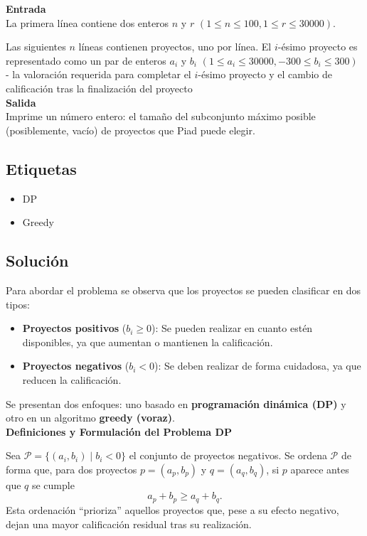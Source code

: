 ﻿\documentclass{article}
\theoremstyle{plain}
\theoremstyle{definition}
\begin{document}
\textbf{Entrada}\\

La primera línea contiene dos enteros $n$ y $r$ $(1 \leq n \leq 100,1 \leq r \leq 30000)$.

Las siguientes $n$ líneas contienen proyectos, uno por línea. El $i$-ésimo proyecto es representado como un par de enteros $a_i$ y $b_i$ $(1 \leq a_i \leq 30000,-300 \leq b_i \leq 300)$ - la valoración requerida para completar el $i$-ésimo proyecto y el cambio de calificación tras la finalización del proyecto
\\

\textbf{Salida}\\

Imprime un número entero: el tamaño del subconjunto máximo posible (posiblemente, vacío) de proyectos que Piad puede elegir.

\subsection{Etiquetas}

\begin{itemize}
    \item DP
    \item Greedy
\end{itemize}

\subsection{Solución}

Para abordar el problema se observa que los proyectos se pueden clasificar en dos tipos:
\begin{itemize}
    \item \textbf{Proyectos positivos} (\(b_i \ge 0\)): Se pueden realizar en cuanto estén disponibles, ya que aumentan o mantienen la calificación.
    \item \textbf{Proyectos negativos} (\(b_i < 0\)): Se deben realizar de forma cuidadosa, ya que reducen la calificación.
\end{itemize}

Se presentan dos enfoques: uno basado en \textbf{programación dinámica (DP)} y otro en un algoritmo \textbf{greedy (voraz)}.
\\


\textbf{Definiciones y Formulación del Problema DP}

Sea \(\mathcal{P} = \{ (a_i,b_i) \mid b_i < 0\}\) el conjunto de proyectos negativos. Se ordena \(\mathcal{P}\) de forma que, para dos proyectos \(p=(a_p,b_p)\) y \(q=(a_q,b_q)\), si \(p\) aparece antes que \(q\) se cumple
\[
a_p+b_p \ge a_q+b_q.
\]
Esta ordenación “prioriza” aquellos proyectos que, pese a su efecto negativo, dejan una mayor calificación residual tras su realización.
\end{document}
